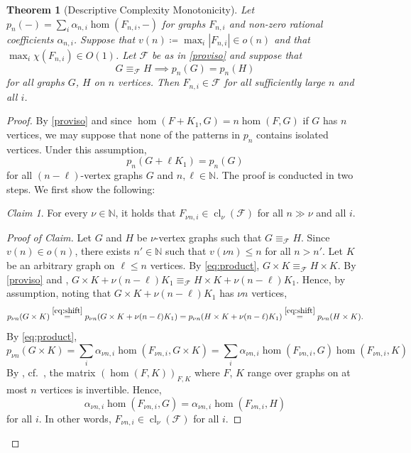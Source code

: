 \documentclass[11pt, DIV=15]{scrarticle}
\theoremstyle{definition}
\theoremstyle{plain}
\newtheorem{theorem}[definition]{Theorem}
\theoremstyle{remark}
\newtheorem{claim}{Claim}[definition]
\newenvironment{claimproof}[1][Proof of Claim]{\begin{proof}[#1] \renewcommand{\qedsymbol}{$\lrcorner$}}{ \end{proof}}
\DeclareMathOperator{\cl}{cl}
\begin{document}
	\begin{theorem}[Descriptive Complexity Monotonicity] \label{thm:complexity-monotonicty}
		Let $p_{n}(-) = \sum_i \alpha_{n,i} \hom(F_{n,i}, -)$ for graphs $F_{n,i}$ and non-zero rational coefficients $\alpha_{n,i}$.
		Suppose that $v(n) \coloneqq \max_i |F_{n,i}| \in o(n)$
		and that $\max_i \chi(F_{n,i}) \in O(1)$.
		Let $\mathcal{F}$ be as in \cref{proviso} and suppose that
		\[
			G \equiv_{\mathcal{F}} H \implies
			p_n(G) = p_n(H)
		\]
		for all graphs $G$, $H$ on $n$ vertices.
		Then $F_{n,i} \in \mathcal{F}$ for all sufficiently large $n$ and all $i$.
	\end{theorem}
	\begin{proof}
		By \cref{proviso}
		and since $\hom(F +K_1, G) = n \hom(F, G)$ if $G$ has $n$ vertices,
		we may suppose that none of the patterns in $p_n$ contains isolated vertices.
		Under this assumption,
		\begin{equation}\label{eq:shift}
			p_n(G + \ell K_1) = p_n(G)
		\end{equation}
		for all $(n-\ell)$-vertex graphs $G$ and $n, \ell \in \mathbb{N}$.
		The proof is conducted in two steps.
		We first show the following:
		\begin{claim}\label{claim:monotonicity}
			For every $\nu \in \mathbb{N}$,
			it holds that $F_{\nu n, i} \in \cl_\nu(\mathcal{F})$ for all $n \gg \nu$ and all $i$.
		\end{claim}
		\begin{claimproof}
			Let $G$ and $H$ be $\nu$-vertex graphs such that $G \equiv_{\mathcal{F}} H$.
			Since $v(n) \in o(n)$,
			there exists $n' \in \mathbb{N}$
			such that $v(\nu n) \leq n$ for all $n > n'$.
			Let $K$ be an arbitrary graph on $\ell \leq n$ vertices.
			By \cref{eq:product},
			$G \times K \equiv_{\mathcal{F}} H \times K$.
			By \cref{proviso} and \cite[Theorem~7]{seppelt_logical_2024},
			$G \times K + \nu (n - \ell)K_1 \equiv_{\mathcal{F}} H \times K +  \nu (n - \ell)K_1$.
			Hence, by assumption, noting that $G \times K +  \nu (n - \ell) K_1$ has $\nu n$ vertices, 
			\[
			p_{\nu n}(G \times K) \overset{\eqref{eq:shift}}{=} p_{\nu n}(G \times K +  \nu (n - \ell) K_1 ) = p_{\nu n}(H \times K +  \nu (n - \ell) K_1 )  \overset{\eqref{eq:shift}}{=}  p_{\nu n}(H \times K).
			\]
			By \cref{eq:product},
			\[
				p_{\nu n}(G \times K) = \sum_i \alpha_{\nu n,i} \hom(F_{\nu n,i}, G \times K)  = \sum_i \alpha_{\nu n,i} \hom(F_{\nu n,i}, G)  \hom(F_{\nu n,i}, K) 
			\]
			By \cite{lovasz_operations_1967}, cf.\ \cite[Lemma~6]{seppelt_logical_2024},
			the matrix $(\hom(F, K))_{F, K}$ where $F$, $K$ range over graphs on at most $n$ vertices is invertible.
			Hence,
			\[
				\alpha_{\nu n,i} \hom(F_{\nu n,i}, G) = \alpha_{\nu n,i} \hom(F_{\nu n,i}, H)
			\]
			for all $i$.
			In other words, $F_{\nu n,i} \in \cl_{\nu}(\mathcal{F})$ for all $i$. 
		\end{claimproof}
	

\end{proof}
\end{document}
